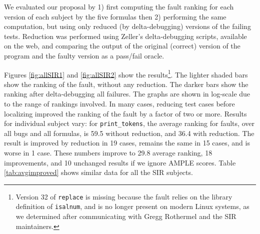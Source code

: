 We evaluated our proposal by 1) first computing the fault ranking for
each version of each subject by the five formulas then 2) performing
the same computation, but using only reduced (by delta-debugging)
versions of the failing tests.  Reduction was performed using Zeller's
delta-debugging scripts, available on the web, and comparing the output
of the original (correct) version of the program and the faulty
version as a pass/fail oracle.

Figures \ref{fig:allSIR1} and \ref{fig:allSIR2} show the
results\footnote{Version 32 of {\tt replace} is missing because the
fault relies on the library definition of {\tt isalnum}, and is no
longer present on modern Linux systems, as we determined after
communicating with Gregg Rothermel and the SIR maintainers.}.  The
lighter shaded bars show the ranking of the fault, without any
reduction.  The darker bars show the ranking after delta-debugging all
failures.  The graphs are shown in log-scale due to the range of
rankings involved.  In many cases, reducing test cases before
localizing improved the ranking of the fault by a factor of two or
more.  Results for individual subject vary: for {\tt print\_tokens},
the average ranking for faults, over all bugs and all formulas, is
59.5 without reduction, and 36.4 with reduction.  The result is
improved by reduction in 19 cases, remains the same in 15 cases, and
is worse in 1 case.  These numbers improve to 29.8 average ranking, 18
improvements, and 10 unchanged results if we ignore AMPLE scores.
Table \ref{tab:avgimproved} shows similar data for all the SIR
subjects.  

